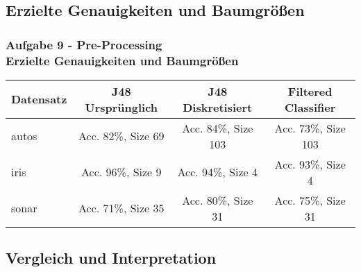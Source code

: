 \documentclass[accentcolor=tud10b,colorbacktitle,inverttitle,landscape,german,presentation,t]{tudbeamer}
\begin{document}
    \subsection{Erzielte Genauigkeiten und Baumgrößen}
    
    \begin{frame}[t]
    \frametitle{Aufgabe 9 - Pre-Processing\\ Erzielte Genauigkeiten und Baumgrößen}
        \begin{tabular}[htbp]{l||c|c|c}
            Datensatz & J48 Ursprünglich & J48 Diskretisiert & Filtered Classifier \\
            \hline
            \hline
            autos & Acc. 82\%, Size 69 & Acc. 84\%, Size 103 & Acc. 73\%, Size 103 \\
            \hline
            iris & Acc. 96\%, Size 9 & Acc. 94\%, Size 4 & Acc. 93\%, Size 4 \\
            \hline
            sonar & Acc. 71\%, Size 35 & Acc. 80\%, Size 31 & Acc. 75\%, Size 31 \\
        \end{tabular}
    \end{frame}
    
    \subsection{Vergleich und Interpretation}
    
\end{document}
